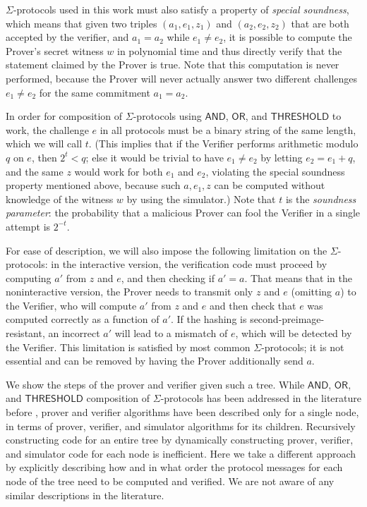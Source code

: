 \documentclass[11pt]{article}
\newcommand{\andnode}{\ensuremath{\mathsf{AND}}}
\newcommand{\ornode}{\ensuremath{\mathsf{OR}}}
\newcommand{\tnode}{\ensuremath{\mathsf{THRESHOLD}}}
\begin{document}
$\Sigma$-protocols used in this work must also satisfy a property of \emph{special soundness}, which means that given two triples $(a_1, e_1, z_1)$ and $(a_2, e_2, z_2)$ that are both accepted by the verifier, and $a_1=a_2$ while $e_1\neq e_2$, it is possible to compute the Prover's secret witness $w$ in polynomial time and thus directly verify that the statement claimed by the Prover is true.   Note that this computation is never performed, because the Prover will never actually answer two different challenges $e_1\neq e_2$ for the same commitment $a_1=a_2$.

In order for composition of $\Sigma$-protocols using $\andnode$, $\ornode$, and $\tnode$ to work, the challenge $e$ in all protocols must be a binary string of the same length, which we will call $t$.  (This implies that if the Verifier performs arithmetic modulo $q$ on $e$, then $2^t<q$; else it would be trivial to have $e_1\neq e_2$ by letting $e_2=e_1+q$, and the same $z$ would work for both $e_1$ and $e_2$, violating the special soundness property mentioned above, because such $a, e_1, z$ can be computed without knowledge of the witness $w$ by using the simulator.)  Note that $t$ is the \emph{soundness parameter}: the probability that a malicious Prover can fool the Verifier in a single attempt is $2^{-t}$.

 For ease of description, we will also impose the following limitation on the $\Sigma$-protocols: in the interactive version, the verification code must proceed by computing $a'$ from $z$ and $e$, and then checking if $a'=a$. That means that in the noninteractive version, the Prover needs to transmit only $z$ and $e$ (omitting $a$) to the Verifier, who will compute $a'$ from $z$ and $e$ and then check that $e$ was computed correctly as a function of $a'$. If the hashing is second-preimage-resistant, an incorrect $a'$ will lead to a mismatch of $e$, which will be detected by the Verifier. This limitation is satisfied by most common $\Sigma$-protocols; it is not essential and can be removed by having the Prover additionally send $a$.

We show the steps of the prover and verifier given such a tree. While $\andnode$, $\ornode$, and $\tnode$ composition of $\Sigma$-protocols has been addressed in the literature before \cite{CDS94}, prover and verifier algorithms have been described only for a single node, in terms of prover, verifier, and simulator algorithms for its children. Recursively constructing code for an entire tree by dynamically constructing prover, verifier, and simulator code for each node is inefficient. Here we take a different approach by explicitly describing how and in what order the protocol messages for each node of the tree need to be computed and verified. We are not aware of any similar descriptions in the literature.
\end{document}
